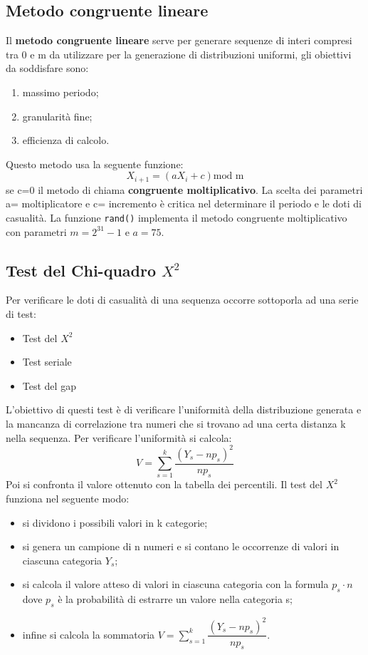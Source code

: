 \subsection{Metodo congruente lineare}
Il \textbf{metodo congruente lineare} serve per generare sequenze di interi compresi tra 0 e m da utilizzare per la generazione di distribuzioni uniformi, gli obiettivi da soddisfare sono:
\begin{enumerate}
    \item massimo periodo;
    \item granularità fine;
    \item efficienza di calcolo.
\end{enumerate}
Questo metodo usa la seguente funzione:
\[X_{i+1}=(aX_i + c) \text{mod m}\]
se c=0 il metodo di chiama \textbf{congruente moltiplicativo}.
La scelta dei parametri a= moltiplicatore e c= incremento è critica nel determinare il periodo e le doti di casualità. La funzione \verb|rand()| implementa il metodo congruente moltiplicativo con parametri $m= 2^31 -1 $ e $a=75$.

\subsection{Test del Chi-quadro $X^2$}
Per verificare le doti di casualità di una sequenza occorre sottoporla ad una serie di test:
\begin{itemize}
    \item Test del $X^2$
    \item Test seriale
    \item Test del gap
\end{itemize}
L'obiettivo di questi test è di verificare l'uniformità della distribuzione generata e la mancanza di correlazione tra numeri che si trovano ad una certa distanza k nella sequenza.
Per verificare l'uniformità si calcola:
\[V= \sum_{s=1}^{k}\dfrac{(Y_s - np_s)^2}{np_s}\]
Poi si confronta il valore ottenuto con la tabella dei percentili.
Il test del $X^2$ funziona nel seguente modo:
\begin{itemize}
    \item si dividono i possibili valori in k categorie;
    \item si genera un campione di n numeri e si contano le occorrenze di valori in ciascuna categoria $Y_s$;
    \item si calcola il valore atteso di valori in ciascuna categoria con la formula $p_s \cdot n$ dove $p_s$ è la probabilità di estrarre un valore nella categoria s;
    \item infine si calcola la sommatoria $V= \sum_{s=1}^{k}\dfrac{(Y_s - np_s)^2}{np_s}$.
\end{itemize}

